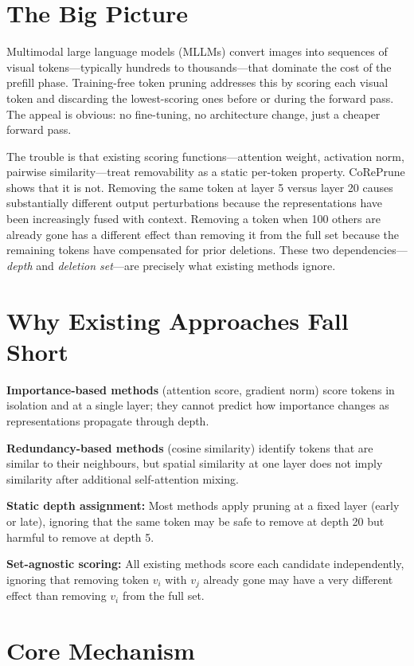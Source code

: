 \documentclass[10pt,twocolumn]{article}
\begin{document}
\section{The Big Picture}

Multimodal large language models (MLLMs) convert images into sequences of
visual tokens---typically hundreds to thousands---that dominate the cost of
the prefill phase. Training-free token pruning addresses this by scoring each
visual token and discarding the lowest-scoring ones before or during the
forward pass. The appeal is obvious: no fine-tuning, no architecture change,
just a cheaper forward pass.

The trouble is that existing scoring functions---attention weight, activation
norm, pairwise similarity---treat removability as a static per-token property.
CoRePrune shows that it is not. Removing the same token at layer 5 versus
layer 20 causes substantially different output perturbations because the
representations have been increasingly fused with context. Removing a token
when 100 others are already gone has a different effect than removing it from
the full set because the remaining tokens have compensated for prior deletions.
These two dependencies---\emph{depth} and \emph{deletion set}---are precisely
what existing methods ignore.

\section{Why Existing Approaches Fall Short}

\textbf{Importance-based methods} (attention score, gradient norm) score tokens
in isolation and at a single layer; they cannot predict how importance changes
as representations propagate through depth.

\textbf{Redundancy-based methods} (cosine similarity) identify tokens that are
similar to their neighbours, but spatial similarity at one layer does not imply
similarity after additional self-attention mixing.

\textbf{Static depth assignment:} Most methods apply pruning at a fixed layer
(early or late), ignoring that the same token may be safe to remove at depth 20
but harmful to remove at depth 5.

\textbf{Set-agnostic scoring:} All existing methods score each candidate
independently, ignoring that removing token $v_i$ with $v_j$ already gone
may have a very different effect than removing $v_i$ from the full set.

\section{Core Mechanism}
\end{document}
